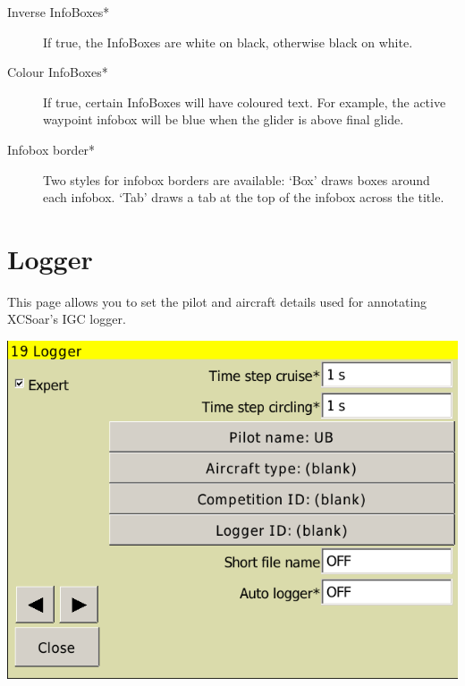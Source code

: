 \begin{description}
\item[Inverse InfoBoxes*]  If true, the InfoBoxes are white on black, otherwise black on white.
\item[Colour InfoBoxes*]  If true, certain InfoBoxes will have coloured text. For example, the 
active waypoint infobox will be blue when the glider is above final glide.
\item[Infobox border*]  Two styles for infobox borders are available: `Box'
draws boxes around each infobox.  `Tab' draws a tab at the top of the infobox across the title.
\end{description}


\clearpage
\section{Logger}

This page allows you to set the pilot and aircraft details used for
annotating XCSoar's IGC logger. 

\begin{center}
\includegraphics[angle=0,width=0.8\linewidth,keepaspectratio='true']{figures/config-logger.png}
\end{center}

